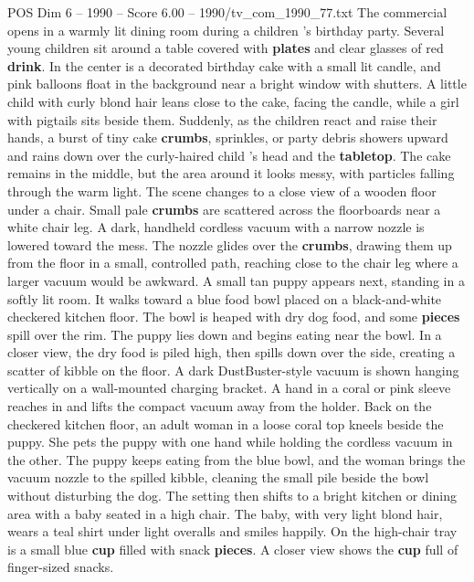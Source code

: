 \begin{textsample}{POS Dim 6 – 1990 – Score 6.00 – 1990/tv\_com\_1990\_77.txt}  \label{ex:f6_pos_078}
The commercial opens in a warmly lit dining room during a children ’s birthday party.
Several young children sit around a table covered with \textbf{plates} and clear glasses of red \textbf{drink}.
In the center is a decorated birthday cake with a small lit candle, and pink balloons float in the background near a bright window with shutters.
A little child with curly blond hair leans close to the cake, facing the candle, while a girl with pigtails sits beside them.
Suddenly, as the children react and raise their hands, a burst of tiny cake \textbf{crumbs}, sprinkles, or party debris showers upward and rains down over the curly-haired child ’s head and the \textbf{tabletop}.
The cake remains in the middle, but the area around it looks messy, with particles falling through the warm light.
The scene changes to a close view of a wooden floor under a chair.
Small pale \textbf{crumbs} are scattered across the floorboards near a white chair leg.
A dark, handheld cordless vacuum with a narrow nozzle is lowered toward the mess.
The nozzle glides over the \textbf{crumbs}, drawing them up from the floor in a small, controlled path, reaching close to the chair leg where a larger vacuum would be awkward.
A small tan puppy appears next, standing in a softly lit room.
It walks toward a blue food bowl placed on a black-and-white checkered kitchen floor.
The bowl is heaped with dry dog food, and some \textbf{pieces} spill over the rim.
The puppy lies down and begins eating near the bowl.
In a closer view, the dry food is piled high, then spills down over the side, creating a scatter of kibble on the floor.
A dark DustBuster-style vacuum is shown hanging vertically on a wall-mounted charging bracket.
A hand in a coral or pink sleeve reaches in and lifts the compact vacuum away from the holder.
Back on the checkered kitchen floor, an adult woman in a loose coral top kneels beside the puppy.
She pets the puppy with one hand while holding the cordless vacuum in the other.
The puppy keeps eating from the blue bowl, and the woman brings the vacuum nozzle to the spilled kibble, cleaning the small pile beside the bowl without disturbing the dog.
The setting then shifts to a bright kitchen or dining area with a baby seated in a high chair.
The baby, with very light blond hair, wears a teal shirt under light overalls and smiles happily.
On the high-chair tray is a small blue \textbf{cup} filled with snack \textbf{pieces}.
A closer view shows the \textbf{cup} full of finger-sized snacks.

\end{textsample}
